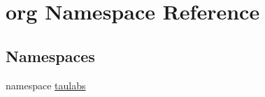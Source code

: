 \hypertarget{namespaceorg}{\section{org \-Namespace \-Reference}
\label{namespaceorg}
}
\subsection*{\-Namespaces}
\begin{DoxyCompactItemize}
\item 
namespace \hyperlink{namespaceorg_1_1taulabs}{taulabs}
\end{DoxyCompactItemize}
